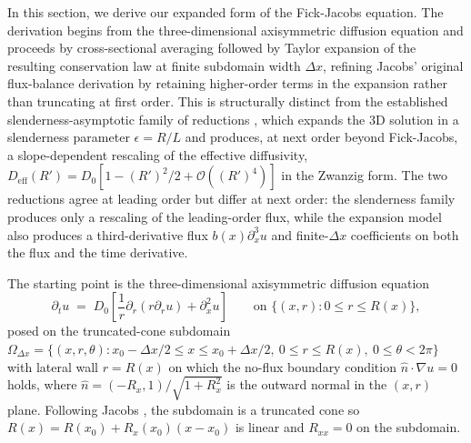 \documentclass[11pt]{article}
\begin{document}
In this section, we derive our expanded form of the Fick-Jacobs equation. The derivation begins from the three-dimensional axisymmetric diffusion equation and proceeds by cross-sectional averaging followed by Taylor expansion of the resulting conservation law at finite subdomain width $\Delta x$, refining Jacobs' original flux-balance derivation \cite{Jacobs1935} by retaining higher-order terms in the expansion rather than truncating at first order. This is structurally distinct from the established slenderness-asymptotic family of reductions \cite{Zwanzig1992, RR01, KP06, DY2014}, which expands the 3D solution in a slenderness parameter $\epsilon = R/L$ and produces, at next order beyond Fick-Jacobs, a slope-dependent rescaling of the effective diffusivity, $D_{\mathrm{eff}}(R') = D_0[1 - (R')^2/2 + \mathcal{O}((R')^4)]$ in the Zwanzig form. The two reductions agree at leading order but differ at next order: the slenderness family produces only a rescaling of the leading-order flux, while the expansion model also produces a third-derivative flux $b(x)\partial_x^3 u$ and finite-$\Delta x$ coefficients on both the flux and the time derivative.

\label{sec:flux-expansion-derivation}

The starting point is the three-dimensional axisymmetric diffusion equation
\begin{equation}
    \partial_t u \;=\; D_0 \left[ \frac{1}{r}\partial_r(r \partial_r u) + \partial_x^2 u \right] \qquad \text{on } \{(x, r): 0 \leq r \leq R(x)\}, \label{eq:3d-axisym}
\end{equation}
posed on the truncated-cone subdomain $\Omega_{\Delta x} = \{(x, r, \theta): x_0 - \Delta x/2 \leq x \leq x_0 + \Delta x/2,\ 0 \leq r \leq R(x),\ 0 \leq \theta < 2\pi\}$ with lateral wall $r = R(x)$ on which the no-flux boundary condition $\hat n \cdot \nabla u = 0$ holds, where $\hat n = (-R_x, 1)/\sqrt{1 + R_x^2}$ is the outward normal in the $(x, r)$ plane. Following Jacobs \cite{Jacobs1935}, the subdomain is a truncated cone so $R(x) = R(x_0) + R_x(x_0)(x - x_0)$ is linear and $R_{xx} = 0$ on the subdomain.
\end{document}
